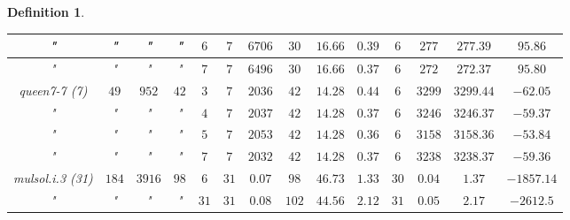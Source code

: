 \documentclass[12pt]{article}
\theoremstyle{slplain}
\newtheorem{defi}{Definition}
\begin{document}
\begin{defi}
\begin{table}[H]
\begin{center}
\begin{tabular}{|c|c|c|c|c|c|c|c|c|c|c|c|c|c|}
\hline
{\small "} & {\small "} & {\small "} & {\small "} & {\small $6$} & {\small $7$} & {\small $6706$} & {\small $30$}  & {\small $16.66$} & {\small $0.39$} & {\small $6$} & {\small $277$} & {\small $277.39$} & {\small $95.86$}\\
\hline
{\small "} & {\small "} & {\small "} & {\small "} & {\small $7$} & {\small $7$} & {\small $6496$} & {\small $30$}  & {\small $16.66$} & {\small $0.37$} & {\small $6$} & {\small $272$} & {\small $272.37$} & {\small $95.80$}\\
\hline
\hline
{\small queen7-7 (7)} & {\small $49$} & {\small $952$} & {\small $42$} & {\small $3$} & {\small $7$} & {\small $2036$} & {\small $42$} & {\small $14.28$} & {\small $0.44$} & {\small $6$} & {\small $3299$} & {\small $3299.44$} & {\small $-62.05$}\\
\hline
{\small "} & {\small "} & {\small "} & {\small "} & {\small $4$} & {\small $7$} & {\small $2037$} & {\small $42$}  & {\small $14.28$} & {\small $0.37$} & {\small $6$} & {\small $3246$} & {\small $3246.37$} & {\small $-59.37$}\\
\hline
{\small "} & {\small "} & {\small "} & {\small "} & {\small $5$} & {\small $7$} & {\small $2053$} & {\small $42$}  & {\small $14.28$} & {\small $0.36$} & {\small $6$} & {\small $3158$} & {\small $3158.36$} & {\small $-53.84$}\\
\hline
{\small "} & {\small "} & {\small "} & {\small "} & {\small $7$} & {\small $7$} & {\small $2032$} & {\small $42$} & {\small $14.28$} & {\small $0.37$} & {\small $6$} & {\small $3238$} & {\small $3238.37$} & {\small $-59.36$}\\
\hline
\hline
{\small mulsol.i.3 (31)} & {\small $184$} & {\small $3916$} & {\small $98$} & {\small $6$} & {\small $31$} & {\small $0.07$} & {\small $98$} & {\small $46.73$} & {\small $1.33$} & {\small $30$} & {\small $0.04$} & {\small $1.37$} & {\small $-1857.14$}\\
\hline
{\small "} & {\small "} & {\small "} & {\small "} & {\small $31$} & {\small $31$} & {\small $0.08$} & {\small $102$} & {\small $44.56$} & {\small $2.12$} & {\small $31$} & {\small $0.05$} & {\small $2.17$} & {\small $-2612.5$}\\

\end{tabular}
\end{center}
\end{table}
\end{defi}
\end{document}
